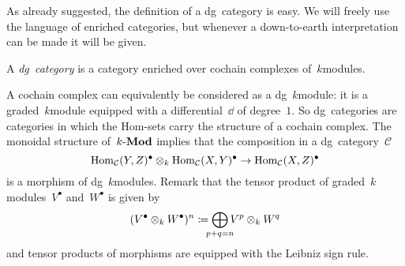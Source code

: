As already suggested, the definition of a dg~category is easy. We will freely use the language of enriched categories, but whenever a down-to-earth interpretation can be made it will be given.
\begin{definition}
  \label{definition:dg-category-enriched}
  A \emph{dg~category} is a category enriched over cochain complexes of~$k$\dash modules.
\end{definition}
A cochain complex can equivalently be considered as a dg~$k$\dash module: it is a graded~$k$\dash module equipped with a differential~$\dd$ of degree~$1$. So dg~categories are categories in which the Hom-sets carry the structure of a cochain complex. The monoidal structure of~$k\textrm{-}\mathbf{Mod}$ implies that the composition in a dg~category~$\mathcal{C}$
\begin{equation}
  \mathrm{Hom}_{\mathcal{C}}(Y,Z)^\bullet\otimes_k\mathrm{Hom}_{\mathcal{C}}(X,Y)^\bullet\to\mathrm{Hom}_{\mathcal{C}}(X,Z)^\bullet
\end{equation}
is a morphism of dg~$k$\dash modules. Remark that the tensor product of graded~$k$\dash modules~$V^\bullet$ and~$W^\bullet$ is given by
\begin{equation}
  (V^\bullet\otimes_k W^\bullet)^n\coloneqq\bigoplus_{\mathclap{p+q=n}}V^p\otimes_k W^q
\end{equation}
and tensor products of morphisms are equipped with the Leibniz sign rule.

